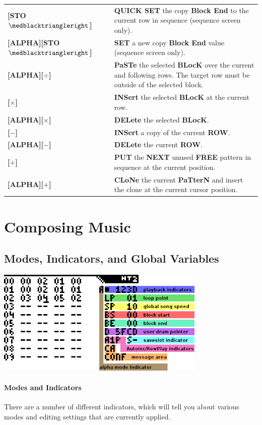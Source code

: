 \documentclass[12pt]{report}	%
\begin{document}
\begin{longtable}{p{} p{} }
\textbf{[STO\(\medblacktriangleright\)]} & \textbf{QUICK SET} the copy \textbf{Block End} to the current row in sequence (sequence screen only). \\
\textbf{[ALPHA][STO\(\medblacktriangleright\)]} & \textbf{SET} a new copy \textbf{Block End} value (sequence screen only). \\
\hline
\textbf{[ALPHA][\(\bm{\div}\)]} & \textbf{PaSTe} the selected \textbf{BLocK} over the current and following rows. The target row must be outside of the selected block. \\
\textbf{[\(\bm{\times}\)]} & \textbf{INSert} the selected \textbf{BLocK} at the current row. \\
\textbf{[ALPHA][\(\bm{\times}\)]} & \textbf{DELete} the selected \textbf{BLocK}. \\
\textbf{[\(\bm{-}\)]} & \textbf{INSert} a copy of the current \textbf{ROW}. \\
\textbf{[ALPHA][\(\bm{-}\)]} & \textbf{DELete} the current \textbf{ROW}. \\
\textbf{[\(\bm{+}\)]} & \textbf{PUT} the \textbf{NEXT} unused \textbf{FREE} pattern in sequence at the current position. \\
\textbf{[ALPHA][\(\bm{+}\)]} & \textbf{CLoNe} the current \textbf{PaTterN} and insert the clone at the current cursor position. \\
\hline
\end{longtable}


\section{Composing Music}
\subsection{Modes, Indicators, and Global Variables}

{\includegraphics[width=0.75\textwidth]{vars}} \newline

\paragraph{Modes and Indicators} There are a number of different indicators, which will tell you about various modes and editing settings that are currently applied.
\end{document}
